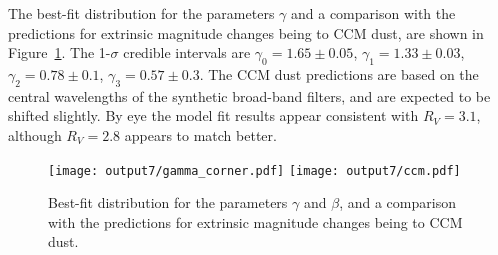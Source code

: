 \documentclass[11pt, oneside]{article}   	%
\begin{document}
The best-fit distribution for the parameters $\gamma$  and a comparison with the predictions for extrinsic
magnitude changes being to CCM dust, are shown in Figure~\ref{gamma:fig}.  The 1-$\sigma$ 
credible intervals are $\gamma_0=1.65 \pm 0.05$,
$\gamma_1 = 1.33  \pm 0.03$, $\gamma_2 = 0.78  \pm 0.1$, $\gamma_3 = 0.57  \pm 0.3$.
The CCM dust predictions are based 
on the central wavelengths of the synthetic broad-band filters, and are expected to be shifted slightly.
By eye the model fit results appear consistent with $R_V=3.1$, although $R_V=2.8$ appears to match better.
\begin{figure}[htbp] %
   \centering
   \texttt{[image: output7/gamma\_corner.pdf]} 
   \texttt{[image: output7/ccm.pdf]} 
   \caption{Best-fit distribution for the parameters $\gamma$ and $\beta$, and a comparison with the predictions for extrinsic
magnitude changes being to CCM dust.}
   \label{gamma:fig}
\end{figure}
\end{document}
